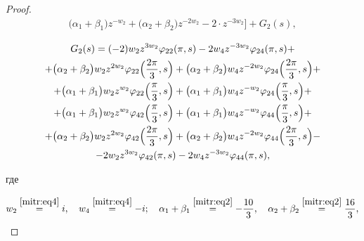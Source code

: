 \begin{proof}
\begin{multline}
\big(\alpha_1+\beta_1\big)z^{-w_2}+

\big(\alpha_2+\beta_2\big)z^{-2w_2}-2\cdot z^{-3w_2}\Big]+G_2(s),

\end{multline}



\begin{multline}

G_2(s) =(-2)w_2z^{3w_2}\varphi_{22}(\pi,s)-

2w_4z^{-3w_2}\varphi_{24}(\pi,s)+ \\

+\big(\alpha_2+\beta_2\big) w_2z^{2w_2}\varphi_{22}\Bigl(\frac{2\pi}3,s\Bigr)+

\big(\alpha_2+\beta_2\big) w_4z^{-2w_2}\varphi_{24}\Bigl(\frac{2\pi}3,s\Bigr)+\\ +

\big(\alpha_1+\beta_1\big) w_2z^{w_2}\varphi_{22}\Bigl(\frac{\pi}3,s\Bigr)+

\big(\alpha_1+\beta_1\big) w_4z^{-w_2}\varphi_{24}\Bigl(\frac{\pi}3,s\Bigr)+\\ +

\big(\alpha_1+\beta_1\big) w_2z^{w_2}\varphi_{42}\Bigl(\frac{\pi}3,s\Bigr)+

\big(\alpha_1+\beta_1\big) w_4z^{-w_2}\varphi_{44}\Bigl(\frac{\pi}3,s\Bigr)+\\+

\big(\alpha_2+\beta_2\big) w_2z^{2w_2}\varphi_{42}\Bigl(\frac{2\pi}3,s\Bigr)+

\big(\alpha_2+\beta_2\big) w_4z^{-2w_2}\varphi_{44}\Bigl(\frac{2\pi}3,s\Bigr)-\\-

2w_2z^{3w_2}\varphi_{42}(\pi,s)- 2w_4z^{-3w_2}\varphi_{44}(\pi,s),

\label{mitr:eq43}

\end{multline}

где

\begin{equation}

w_2\stackrel{\eqref{mitr:eq4}}{=}i,  \quad w_4\stackrel{\eqref{mitr:eq4}}{=}-i; \quad \alpha_1+\beta_1 \stackrel{\eqref{mitr:eq2}}{=}-\frac{10}3, \quad \alpha_2+\beta_2 \stackrel{\eqref{mitr:eq2}}{=}\frac{16}3,

\end{equation}


\end{proof}
